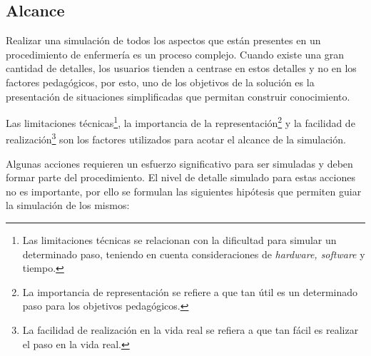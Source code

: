 \subsection{Alcance}

Realizar una simulación de todos los aspectos que están presentes en un
procedimiento de enfermería es un proceso complejo. Cuando existe una gran
cantidad de detalles, los usuarios tienden a centrase en estos detalles y no en
los factores pedagógicos\cite{videojuegos:gonzaleztardon}, por esto, uno de los
objetivos de la solución es la presentación de situaciones simplificadas que
permitan construir conocimiento.

Las limitaciones técnicas\footnote{Las limitaciones técnicas se relacionan con
    la dificultad para simular un determinado paso, teniendo en cuenta
    consideraciones de \textit{hardware, software} y tiempo.}, la importancia de
la representación\footnote{La importancia de representación se refiere a que tan útil es
    un determinado paso para los objetivos pedagógicos.} y la facilidad de
realización\footnote{La facilidad de realización en la vida real
    se refiera a que tan fácil es realizar el paso en la vida real.} son los
factores utilizados para acotar el alcance de la simulación.

Algunas acciones requieren un esfuerzo significativo para ser simuladas y deben
formar parte del procedimiento. El nivel de detalle simulado para estas acciones
no es importante, por ello se formulan las siguientes hipótesis que permiten
guiar la simulación de los mismos:


